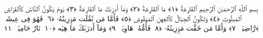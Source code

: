 
  
    
  
    
    

\nopagebreak
  بِسمِ ٱللَّهِ ٱلرَّحمَـٰنِ ٱلرَّحِيمِ
  ٱلقَارِعَةُ ﴿١﴾
 مَا ٱلقَارِعَةُ ﴿٢﴾
 وَمَآ أَدرَىٰكَ مَا ٱلقَارِعَةُ ﴿٣﴾
 يَومَ يَكُونُ ٱلنَّاسُ كَٱلفَرَاشِ ٱلمَبثُوثِ ﴿٤﴾
 وَتَكُونُ ٱلجِبَالُ كَٱلعِهنِ ٱلمَنفُوشِ ﴿٥﴾
 فَأَمَّا مَن ثَقُلَت مَوَٟزِينُهُۥ ﴿٦﴾
 فَهُوَ فِى عِيشَةٍۢ رَّاضِيَةٍۢ ﴿٧﴾
 وَأَمَّا مَن خَفَّت مَوَٟزِينُهُۥ ﴿٨﴾
 فَأُمُّهُۥ هَاوِيَةٌۭ ﴿٩﴾
 وَمَآ أَدرَىٰكَ مَا هِيَه ﴿١٠﴾
 نَارٌ حَامِيَةٌۢ ﴿١١﴾
 
